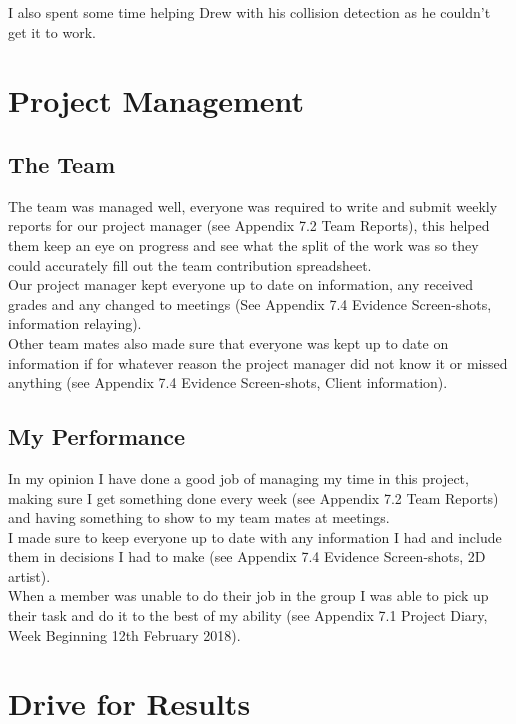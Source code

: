 \documentclass[10pt, a4paper]{article}
\begin{document}
	I also spent some time helping Drew with his collision detection as he couldn't get it to work.
	
	\section{Project Management}
	\subsection{The Team}
	The team was managed well, everyone was required to write and submit weekly reports for our project manager (see Appendix 7.2 Team Reports), this helped them keep an eye on progress and see what the split of the work was so they could accurately fill out the team contribution spreadsheet.\\
	
	Our project manager kept everyone up to date on information, any received grades and any changed to meetings (See Appendix 7.4 Evidence Screen-shots, information relaying).\\
	
	Other team mates also made sure that everyone was kept up to date on information if for whatever reason the project manager did not know it or missed anything (see Appendix 7.4 Evidence Screen-shots, Client information).
	
	\subsection{My Performance}
	
	In my opinion I have done a good job of managing my time in this project, making sure I get something done every week (see Appendix 7.2 Team Reports) and having something to show to my team mates at meetings.\\
	
	I made sure to keep everyone up to date with any information I had and include them in decisions I had to make (see Appendix 7.4 Evidence Screen-shots, 2D artist).\\
	
	When a member was unable to do their job in the group I was able to pick up their task and do it to the best of my ability (see Appendix 7.1 Project Diary, Week Beginning 12th February 2018).
	
	\section{Drive for Results}
\end{document}
